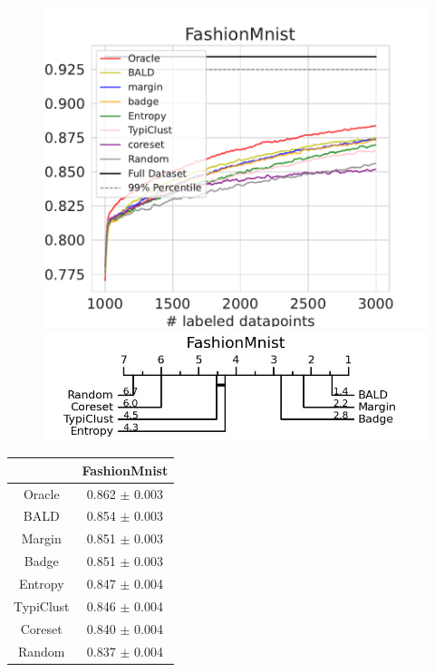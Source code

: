 \documentclass[]{article}
\begin{document}
\begin{minipage}{0.65\linewidth}
\begin{figure}[H]
    \centering
    \includegraphics[width=\linewidth]{img/eval_fmnist}\\ [2mm]
    \includegraphics[width=\linewidth]{img/micro_fmnist.jpg}
\end{figure}
\end{minipage}
\begin{minipage}{0.29\linewidth}
\begin{tabular}{c|c}
&FashionMnist\\
\hline
Oracle&0.862 $\pm$ 0.003\\
BALD&0.854 $\pm$ 0.003\\
Margin&0.851 $\pm$ 0.003\\
Badge&0.851 $\pm$ 0.003\\
Entropy&0.847 $\pm$ 0.004\\
TypiClust&0.846 $\pm$ 0.004\\
Coreset&0.840 $\pm$ 0.004\\
Random&0.837 $\pm$ 0.004\\
\end{tabular}
\end{minipage}
\end{document}
